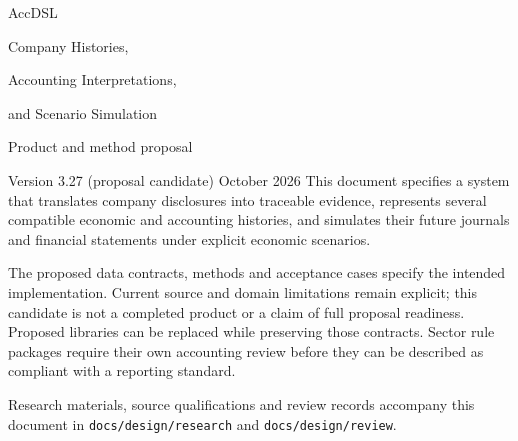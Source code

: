 \documentclass[11pt,a4paper]{report}
\newcommand{\code}[1]{\texttt{#1}}
\begin{document}
\hypersetup{pageanchor=false}
\begin{titlepage}
\vspace*{20mm}
{\sffamily\color{ink}\Huge AccDSL\par}
\vspace{7mm}
{\LARGE Company Histories,\par Accounting Interpretations,\par and Scenario Simulation\par}
\vspace{12mm}
{\Large Product and method proposal\par}
\vspace{5mm}
Version 3.27 (proposal candidate)  October 2026
\vfill
This document specifies a system that translates company disclosures into
traceable evidence, represents several compatible economic and accounting
histories, and simulates their future journals and financial statements under
explicit economic scenarios.

The proposed data contracts, methods and acceptance cases specify the intended
implementation. Current source and domain limitations remain explicit; this
candidate is not a completed product or a claim of full proposal readiness. Proposed libraries can be replaced while preserving those
contracts. Sector rule packages require their own accounting review before
they can be described as compliant with a reporting standard.

\vspace{8mm}
Research materials, source qualifications and review records accompany this
document in \code{docs/design/research} and \code{docs/design/review}.
\end{titlepage}
\hypersetup{pageanchor=true}
\tableofcontents
\clearpage{}














\appendix




\begingroup\raggedright

\endgroup
\end{document}
